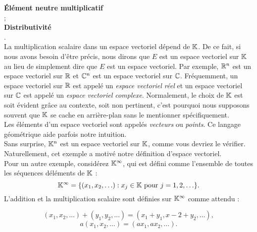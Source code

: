 \documentclass[12pt]{book}
\theoremstyle{plain}
\begin{document}
\noindent
\textbf{Élément neutre multiplicatif}\\
 ;\\

\noindent
\textbf{Distributivité}\\
.\\

\indent
La multiplication scalaire dans un espace vectoriel dépend de $\mathbb{K}$. De ce fait, si nous avons besoin d’être précis, nous dirons que $E$ est un espace vectoriel sur $\mathbb{K}$ au lieu de simplement dire que $E$ est un espace vectoriel. Par exemple, $\mathbb{R}^n$ est un espace vectoriel sur $\mathbb{R}$ et $\mathbb{C}^n$ est un espace vectoriel sur $\mathbb{C}$. Fréquemment, un espace vectoriel sur $\mathbb{R}$ est appelé un \textit{espace vectoriel réel} et un espace vectoriel sur $\mathbb{C}$ est appelé un \textit{espace vectoriel complexe}. Normalement, le choix de $\mathbb{K}$ est soit évident grâce au contexte, soit non pertinent, c'est pourquoi nous supposons souvent que $\mathbb{K}$ se cache en arrière-plan sans le mentionner spécifiquement.\\
\indent
Les éléments d'un espace vectoriel sont appelés \textit{vecteurs} ou \textit{points}. Ce langage géométrique aide parfois notre intuition.\\
\indent
Sans surprise, $\mathbb{K}^n$ est un espace vectoriel sur $\mathbb{K}$, comme vous devriez le vérifier. Naturellement, cet exemple a motivé notre définition d'espace vectoriel.\\
\indent{}
Pour un autre exemple, considérez $\mathbb{K}^{\infty}$, qui est défini comme l'ensemble de toutes les séquences déléments de $\mathbb{K}$ :
\begin{equation*}
    \mathbb{K}^{\infty} = \{(x_1,x_2,\ldots):x_j\in\mathbb{K} \textrm{~pour~} j=1,2,\ldots\}.
\end{equation*}
L'addition et la multiplication scalaire sont définies sur $\mathbb{K}^{\infty}$ comme attendu :



\begin{equation*}
    (x_1,x_2,\ldots)+(y_1,y_2,\ldots)=(x_1+y_1,x-2+y_2,\ldots),
\end{equation*}
\begin{equation*}
    a(x_1,x_2,\ldots)=(ax_1,ax_2,\ldots).
\end{equation*}
\end{document}
